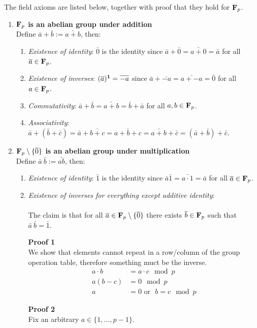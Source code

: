 The field axioms are listed below, together with proof that they hold for $\mathbf{F}_p$.
\begin{enumerate}
\item \textbf{$\mathbf{F}_p$ is an abelian group under addition}\\
  Define $\bar a + \bar b := \bar{a + b}$, then:
  \begin{enumerate}
  \item \textit{Existence of identity}: $\bar 0$ is the identity since
    $\bar a + \bar 0 = \bar{a + 0} = \bar{a}$ for all $\overline a \in \mathbf{F}_p$.
  \item \textit{Existence of inverses}: $(\overline a)^{\mathbf 1} = \overline{-a}$ since
    $\bar a + \bar{-a} = \bar{a + -a} = \bar{0}$ for all $a \in \mathbf{F}_p$.
  \item \textit{Commutativity}:
    $\bar a + \bar b = \bar{a + b} = \bar{b} + \bar{a}$ for all $a, b \in \mathbf{F}_p$.
  \item \textit{Associativity}:
    $\bar a + (\bar b + \bar c) = \bar a + \bar {b + c} = \bar{a + b + c} =
    \bar{a + b} + \bar{c} = (\bar a + \bar b) + \bar{c}$.
  \end{enumerate}
\item \textbf{$\mathbf{F}_p\setminus\{\overline 0\}$ is an abelian group under multiplication}\\
  Define $\bar a ~ \bar b := \bar{ab}$, then:
  \begin{enumerate}
  \item \textit{Existence of identity}: $\bar 1$ is the identity since
    $\bar a \bar 1 = \bar{a\cdot 1} = \bar{a}$ for all $\overline a \in \mathbf{F}_p$.
    \newpage
  \item \textit{Existence of inverses for everything except additive identity}:\\\\
    The claim is that for all $\overline a \in \mathbf{F}_p \setminus \{\overline 0\}$ there
    exists $\overline b \in \mathbf{F}_p$ such that $\bar a ~ \bar b = \bar 1$.

    \textbf{Proof 1}\\
    We show that elements cannot repeat in a row/column of the group operation
    table, therefore something muct be the inverse.
    \begin{align*}
      a \cdot b &= a \cdot c \mod p\\
      a(b - c) &= 0 \mod p\\
      a &= 0 \text{~or~~} b = c \mod p
    \end{align*}

    \textbf{Proof 2}\\
    Fix an arbitrary $a \in \{1, \ldots, p-1\}$.


\end{enumerate}
\end{enumerate}
